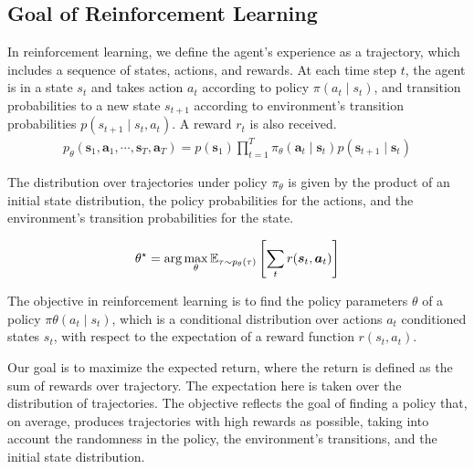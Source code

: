 \subsection{Goal of Reinforcement Learning}

In reinforcement learning, we define the agent's experience as a trajectory, which includes a sequence of states, actions, and rewards. At each time step $t$, the agent is in a state $s_t$ and takes action $a_t$ according to policy $\pi(a_t \mid s_t)$, and transition probabilities to a new state $s_{t+1}$ according to environment's transition probabilities $p(s_{t+1} \mid s_{t}, a_{t})$. A reward $r_t$ is also received.
\begin{align*}
    p_{\theta}(\boldsymbol{s}_1, \boldsymbol{a}_1, \cdots ,\boldsymbol{s}_T, \boldsymbol{a}_T) = p(\boldsymbol{s}_1) \prod_{t=1}^{T} \pi_{\theta}(\boldsymbol{a}_{t} \mid \boldsymbol{s}_t) p(\boldsymbol{s}_{t+1} \mid \boldsymbol{s}_t)
\end{align*}



The distribution over trajectories under policy $\pi_\theta$ is given by the product of an initial state distribution, the policy probabilities for the actions, and the environment's transition probabilities for the state. 


\begin{align*}\label{RL-Objective}
    \theta^{\star} = \arg \max_{\theta} \mathbb E_{\tau \sim p_{\theta}(\tau)} \left[ 
    \sum_{t} r(\boldsymbol{s}_t, \boldsymbol{a}_t)
    \right]
\end{align*}

The objective in reinforcement learning is to find the policy parameters $\theta$ of a policy $\pi{\theta}(a_t \mid s_t)$, which is a conditional distribution over actions $a_t$ conditioned states $s_t$, with respect to the expectation of a reward function $r(s_t, a_t)$. 

Our goal is to maximize the expected return, where the return is defined as the sum of rewards over trajectory. The expectation here is taken over the distribution of trajectories. The objective reflects the goal of finding a policy that, on average, produces trajectories with high rewards as possible, taking into account the randomness in the policy, the environment's transitions, and the initial state distribution. 

